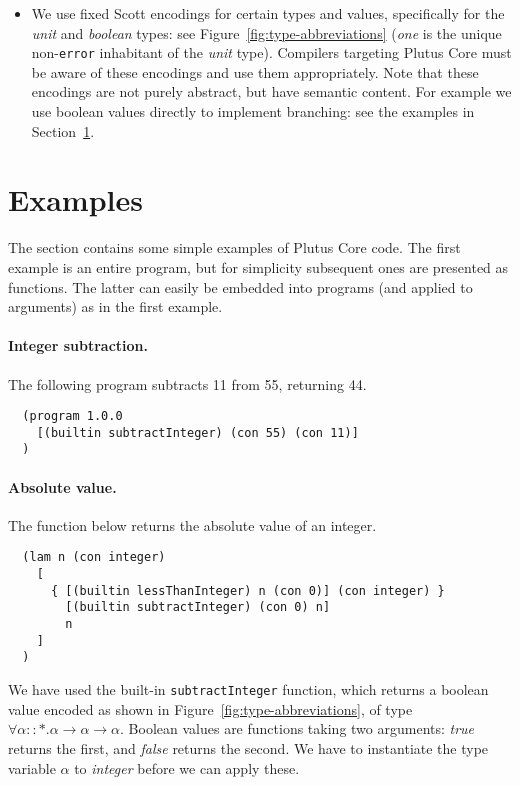 \documentclass[a4paper]{article}
\begin{document}
\begin{itemize}
  \item We use fixed Scott encodings for certain types and values,
    specifically for the \textit{unit} and \textit{boolean} types: see
    Figure~\ref{fig:type-abbreviations} (\textit{one} is the unique
    non-\verb|error| inhabitant of the \textit{unit} type).  Compilers
    targeting Plutus Core must be aware of these encodings and use
    them appropriately.  Note that these encodings are not purely
    abstract, but have semantic content. For example we use boolean
    values directly to implement branching: see the examples in
    Section~\ref{sec:examples}.
\end{itemize}


\section{Examples}
\label{sec:examples}
The section contains some simple examples of Plutus Core code. The
first example is an entire program, but for simplicity subsequent ones
are presented as functions. The latter can easily be embedded into
programs (and applied to arguments) as in the first example.

\paragraph{Integer subtraction.}
The following program subtracts 11 from 55, returning 44.

\begin{verbatim}
  (program 1.0.0
    [(builtin subtractInteger) (con 55) (con 11)]
  )
\end{verbatim}


\paragraph{Absolute value.} The function below returns the absolute value of an
integer.
\begin{verbatim}
  (lam n (con integer)
    [
      { [(builtin lessThanInteger) n (con 0)] (con integer) }
        [(builtin subtractInteger) (con 0) n]
        n
    ]
  )
\end{verbatim}

\noindent We have used the built-in \verb|subtractInteger|
function, which returns a boolean value encoded as shown in
Figure~\ref{fig:type-abbreviations}, of type
$\forall \alpha::\ast. \alpha \rightarrow \alpha \rightarrow \alpha$.
Boolean values are functions taking two arguments: \textit{true}
returns the first, and \textit{false} returns the second.  We have to
instantiate the type variable $\alpha$ to \textit{integer} before we
can apply these.
\end{document}
